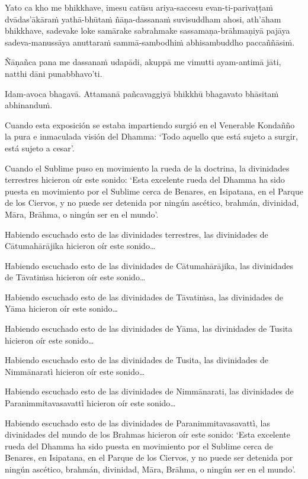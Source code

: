 Yato ca kho me bhikkhave, imesu catūsu ariya-saccesu evan-ti-parivaṭṭaṁ
dvādas'ākāraṁ yathā-bhūtaṁ ñāṇa-dassanaṁ suvisuddham ahosi, ath'āham
bhikkhave, sadevake loke samārake sabrahmake sassamaṇa-brāhmaṇiyā pajāya
sadeva-manussāya anuttaraṁ sammā-sambodhiṁ abhisambuddho paccaññāsiṁ.

Ñāṇañca pana me dassanaṁ udapādi, akuppā me vimutti ayam-antimā jāti,
natthi dāni punabbhavo'ti.

Idam-avoca bhagavā. Attamanā pañcavaggiyā bhikkhū bhagavato bhāsitaṁ
abhinanduṁ.

\clearpage

\englishText
\markboth{\englishTitle}{\rightmark}

Cuando esta exposición se estaba impartiendo surgió en el Venerable Kondañño la pura e inmaculada visión del Dhamma: ‘Todo aquello que está sujeto a surgir, está sujeto a cesar’.

Cuando el Sublime puso en movimiento la rueda de la doctrina, la divinidades terrestres hicieron oír este sonido: ‘Esta excelente rueda del Dhamma ha sido puesta en movimiento por el Sublime cerca de Benares, en Isipatana, en el Parque de los Ciervos, y no puede ser detenida por ningún ascético, brahmán, divinidad, Māra, Brāhma, o ningún ser en el mundo’.

Habiendo escuchado esto de las divinidades terrestres, las divinidades de Cātumahārājika hicieron oír este sonido\ldots

Habiendo escuchado esto de las divinidades de Cātumahārājika, las divinidades de Tāvatiṁsa hicieron oír este sonido\ldots

Habiendo escuchado esto de las divinidades de Tāvatiṁsa, las divinidades de Yāma hicieron oír este sonido\ldots  

Habiendo escuchado esto de las divinidades de Yāma, las divinidades de Tusita hicieron oír este sonido\ldots

Habiendo escuchado esto de las divinidades de Tusita, las divinidades de Nimmānaratì hicieron oír este sonido\ldots

Habiendo escuchado esto de las divinidades de Nimmānarati, las divinidades de Paranimmitavasavattì hicieron oír este sonido\ldots

Habiendo escuchado esto de las divinidades de Paranimmitavasavattì, las divinidades del mundo de los Brahmas hicieron oír este sonido: ‘Esta excelente rueda del Dhamma ha sido puesta en movimiento por el Sublime cerca de Benares, en Isipatana, en el Parque de los Ciervos, y no puede ser detenida por ningún ascético, brahmán, divinidad, Māra, Brāhma, o ningún ser en el mundo’.



